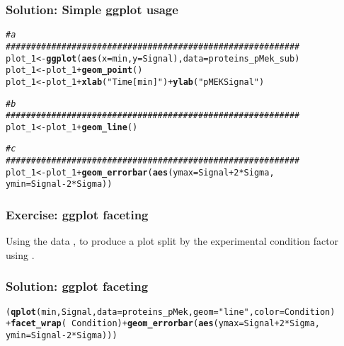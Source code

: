 \documentclass{article}\usepackage[]{graphicx}\usepackage[usenames,dvipsnames]{color}
\makeatletter
\newcommand{\hlnum}[1]{\textcolor[rgb]{0.686,0.059,0.569}{#1}}%
\newcommand{\hlstr}[1]{\textcolor[rgb]{0.192,0.494,0.8}{#1}}%
\newcommand{\hlcom}[1]{\textcolor[rgb]{0.678,0.584,0.686}{\textit{#1}}}%
\newcommand{\hlopt}[1]{\textcolor[rgb]{0,0,0}{#1}}%
\newcommand{\hlstd}[1]{\textcolor[rgb]{0.345,0.345,0.345}{#1}}%
\newcommand{\hlkwb}[1]{\textcolor[rgb]{0.69,0.353,0.396}{#1}}%
\newcommand{\hlkwc}[1]{\textcolor[rgb]{0.333,0.667,0.333}{#1}}%
\newcommand{\hlkwd}[1]{\textcolor[rgb]{0.737,0.353,0.396}{\textbf{#1}}}%
\newenvironment{kframe}{%
 \def\at@end@of@kframe{}%
 \ifinner\ifhmode%
  \def\at@end@of@kframe{\end{minipage}}%
  \begin{minipage}{\columnwidth}%
 \fi\fi%
 \def\FrameCommand##1{\hskip\@totalleftmargin \hskip-\fboxsep
 \colorbox{shadecolor}{##1}\hskip-\fboxsep
     \hskip-\linewidth \hskip-\@totalleftmargin \hskip\columnwidth}%
 \MakeFramed {\advance\hsize-\width
   \@totalleftmargin\z@ \linewidth\hsize
   \@setminipage}}%
 {\par\unskip\endMakeFramed%
 \at@end@of@kframe}
\newenvironment{knitrout}{}{} %
\makeatother
\begin{document}
\subsubsection*{Solution: Simple ggplot usage }
\begin{knitrout}
\color{fgcolor}\begin{kframe}
\begin{alltt}
\hlcom{#a}
\hlcom{##########################################################}
\hlstd{plot_1} \hlkwb{<-} \hlkwd{ggplot}\hlstd{(}\hlkwd{aes}\hlstd{(} \hlkwc{x} \hlstd{= min,} \hlkwc{y} \hlstd{= Signal ),} \hlkwc{data} \hlstd{= proteins_pMek_sub)}
\hlstd{plot_1} \hlkwb{<-} \hlstd{plot_1} \hlopt{+} \hlkwd{geom_point}\hlstd{()}
\hlstd{plot_1} \hlkwb{<-} \hlstd{plot_1}  \hlopt{+} \hlkwd{xlab}\hlstd{(}\hlstr{"Time [min]"}\hlstd{)} \hlopt{+} \hlkwd{ylab}\hlstd{(}\hlstr{"pMEK Signal"}\hlstd{)}

\hlcom{#b}
\hlcom{##########################################################}
\hlstd{plot_1} \hlkwb{<-} \hlstd{plot_1} \hlopt{+} \hlkwd{geom_line}\hlstd{()}

\hlcom{#c}
\hlcom{##########################################################}
\hlstd{plot_1} \hlkwb{<-} \hlstd{plot_1} \hlopt{+} \hlkwd{geom_errorbar}\hlstd{(}\hlkwd{aes}\hlstd{(}\hlkwc{ymax} \hlstd{= Signal}\hlopt{+}\hlnum{2}\hlopt{*}\hlstd{Sigma,}
\hlkwc{ymin} \hlstd{= Signal}\hlopt{-}\hlnum{2}\hlopt{*}\hlstd{Sigma))}
\end{alltt}
\end{kframe}
\end{knitrout}


\subsubsection*{Exercise: ggplot faceting}
 
Using the data , 
to produce a plot split by the experimental condition factor using 
. 



\subsubsection*{Solution: ggplot faceting}
\begin{knitrout}
\color{fgcolor}\begin{kframe}
\begin{alltt}
\hlstd{(}\hlkwd{qplot}\hlstd{(min, Signal,} \hlkwc{data} \hlstd{= proteins_pMek,} \hlkwc{geom} \hlstd{=} \hlstr{"line"}\hlstd{,} \hlkwc{color} \hlstd{= Condition)}
\hlopt{+} \hlkwd{facet_wrap}\hlstd{(} \hlopt{~} \hlstd{Condition)} \hlopt{+} \hlkwd{geom_errorbar}\hlstd{(}\hlkwd{aes}\hlstd{(}\hlkwc{ymax} \hlstd{= Signal}\hlopt{+}\hlnum{2}\hlopt{*}\hlstd{Sigma,}
\hlkwc{ymin} \hlstd{= Signal}\hlopt{-}\hlnum{2}\hlopt{*}\hlstd{Sigma)))}
\end{alltt}
\end{kframe}
\end{knitrout}
\end{document}
